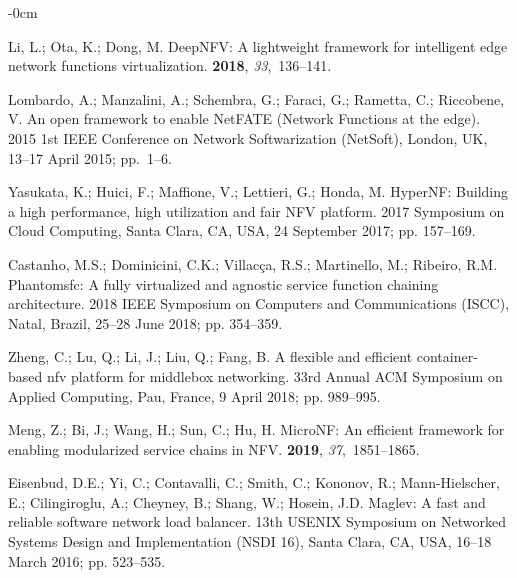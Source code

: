 \documentclass[futureinternet,review,accept,pdftex,moreauthors]{Definitions/mdpi}
\begin{document}
\begin{adjustwidth}{-\extralength}{0cm}
\begin{thebibliography}{999}
Li, L.; Ota, K.; Dong, M.
\newblock DeepNFV: A lightweight framework for intelligent edge network
  functions virtualization.
 {\bf 2018}, {\em 33},~136--141.

Lombardo, A.; Manzalini, A.; Schembra, G.; Faraci, G.; Rametta, C.; Riccobene,
  V.
\newblock An open framework to enable NetFATE (Network Functions at the edge).
 2015 1st IEEE Conference on Network
  Softwarization (NetSoft),  London, UK, 13--17 April 2015; \mbox{pp. 1--6.}

Yasukata, K.; Huici, F.; Maffione, V.; Lettieri, G.; Honda, M.
\newblock HyperNF: Building a high performance, high utilization and fair NFV
  platform.
 2017 Symposium on Cloud Computing,  Santa Clara, CA, USA, 24 September 2017; pp.
  157--169.

Castanho, M.S.; Dominicini, C.K.; Villac{\c{c}}a, R.S.; Martinello, M.;
  Ribeiro, R.M.
\newblock Phantomsfc: A fully virtualized and agnostic service function
  chaining architecture.
  2018 IEEE Symposium on Computers and Communications (ISCC),  Natal, Brazil,  25--28 June 2018; pp. 354--359.

Zheng, C.; Lu, Q.; Li, J.; Liu, Q.; Fang, B.
\newblock A flexible and efficient container-based nfv platform for middlebox
  networking.
 33rd Annual ACM Symposium on Applied Computing, Pau, France, 9 April 2018; pp. 989--995.

Meng, Z.; Bi, J.; Wang, H.; Sun, C.; Hu, H.
\newblock MicroNF: An efficient framework for enabling modularized service
  chains in NFV.
 {\bf 2019},
  {\em 37},~1851--1865.

Eisenbud, D.E.; Yi, C.; Contavalli, C.; Smith, C.; Kononov, R.; Mann-Hielscher,
  E.; Cilingiroglu, A.; Cheyney, B.; Shang, W.; Hosein, J.D.
\newblock Maglev: A fast and reliable software network load balancer.
 13th USENIX Symposium on Networked Systems Design and
  Implementation (NSDI 16),  Santa Clara, CA, USA, 16--18 March 2016; pp. 523--535.


\end{thebibliography}
\end{adjustwidth}
\end{document}
